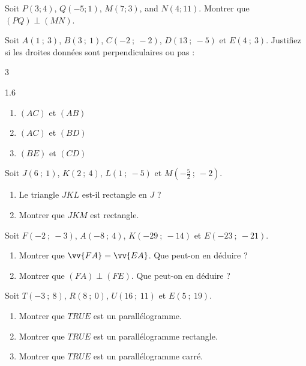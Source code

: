 \documentclass[main.tex]{subfiles}
\begin{document}
\begin{exercise} Soit $P(3;4)$, $Q(-5;1)$, $M(7;3)$, and $N(4;11)$. Montrer que   $(PQ)\perp (MN)$. 
\end{exercise}
\begin{exercise}[entrainement] Soit $A(1\ ;\ 3)$, $B(3\ ;\ 1)$, $C(-2\ ;\ -2)$, $D(13\ ;\ -5)$ et $E(4\ ;\ 3)$. Justifiez si les droites données sont perpendiculaires ou pas :
	\vspace{-1.0em}
\begin{multicols}{3}
\begin{spacing}{1.6}
	\begin{enumerate}[label=\arabic*),leftmargin=*]
		\item $(AC)$ et $(AB)$
		\item $(AC)$ et $(BD)$
		\item $(BE)$ et $(CD)$
	\end{enumerate}	
\end{spacing}
\end{multicols}  \vspace{-1.0em}
\end{exercise}
\begin{exercise} Soit $J(6\ ;\ 1)$, $K(2\ ;\ 4)$, $L(1\ ;\ -5)$ et $M\left(-\tfrac{5}{2}\ ;\ -2\right)$.
	\begin{enumerate}[label=\arabic*),leftmargin=*]
		\item Le triangle $JKL$ est-il rectangle en $J$ ?
		\item Montrer que $JKM$ est  rectangle.
	\end{enumerate}
\end{exercise}
\begin{exercise} Soit $F(-2\ ;\ -3)$, $A(-8\ ;\ 4)$, $K(-29\ ;\ -14)$ et $E\left(-23\ ;\ -21\right)$.
	\begin{enumerate}[label=\arabic*),leftmargin=*]
		\item Montrer que $\vv{FA}=\vv{EA}$. Que peut-on en déduire ?
		\item Montrer que $(FA)\perp (FE)$. Que peut-on en déduire ?
	\end{enumerate}
\end{exercise}
\begin{exercise}[entrainement] Soit $T(-3\ ;\ 8)$, $R(8\ ;\ 0)$, $U(16\ ;\ 11)$ et $E\left(5\ ;\ 19\right)$.
		\begin{enumerate}[label=\arabic*),leftmargin=*]
		\item Montrer que $TRUE$ est un parallélogramme.
		\item Montrer que $TRUE$ est un parallélogramme rectangle.
		\item Montrer que $TRUE$ est un parallélogramme carré.
	\end{enumerate}
\end{exercise}
\end{document}
